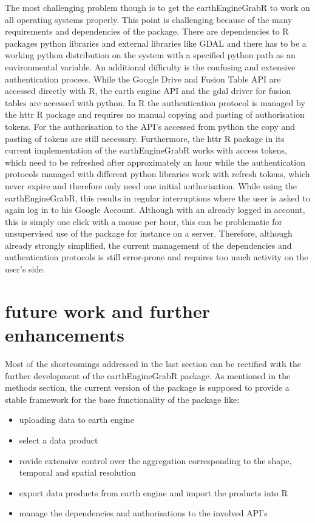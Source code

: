 \documentclass[11pt,twoside,a4paper,final]{report}
\begin{document}
The most challenging problem though is to get the earthEngineGrabR to work on all operating systems properly. This point is challenging because of the many requirements and dependencies of the package. There are dependencies to R packages python libraries and external libraries like GDAL and there has to be a working python distribution on the system with a specified python path as an environmental variable. An additional difficulty is the confusing and extensive authentication process. While the Google Drive and Fusion Table API are accessed directly with R, the earth engine API and the gdal driver for fusion tables are accessed with python. In R the authentication protocol is managed by the httr R package and requires no manual copying and pasting of authorisation tokens. For the authorisation to the API's accessed from python the copy and pasting of tokens are still necessary. 
Furthermore, the httr R package in its current implementation of the earthEngineGrabR works with access tokens, which need to be refreshed after approximately an hour while the authentication protocols managed with different python libraries work with refresh tokens, which never expire and therefore only need one initial authorisation. While using the earthEngineGrabR, this results in regular interruptions where the user is asked to again log in to his Google Account. Although with an already logged in account, this is simply one click with a mouse per hour, this can be problematic for unsupervised use of the package for instance on a  server. Therefore, although already strongly simplified, the current management of the dependencies and authentication protocols is still error-prone and requires too much activity on the user's side.

\section{future work and further enhancements}

Most of the shortcomings addressed in the last section can be rectified with the further development of the earthEngineGrabR package. As mentioned in the methods section, the current version of the package is supposed to provide a stable framework for the base functionality of the package like: 

\begin{itemize}

\item uploading data to earth engine
\item select a data product
\item rovide extensive control over the aggregation corresponding to the shape, temporal and spatial resolution
\item export data products from earth engine and import the products into R
\item manage the dependencies and authorisations to the involved API's

\end{itemize}
\end{document}
